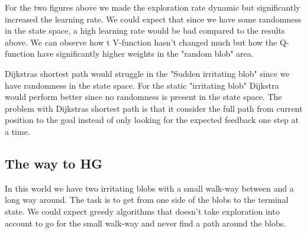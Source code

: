 \documentclass[a4paper,12pt]{article}
\begin{document}
For the two figures above we made the exploration rate dynamic but significantly increased the learning rate. We could expect that since we have some randomness in the state space, a high learning rate would be bad compared to the results above. We can observe how t V-function hasn't changed much but how the Q-function have significantly higher weights in the "random blob" area. 

Dijkstras shortest path would struggle in the "Sudden irritating blob" since we have randomness in the state space. For the static "irritating blob" Dijkstra would perform better since no randomness is present in the state space. The problem with Dijkstras shortest path  is that it consider the full path from current position to the goal instead of only looking for the expected feedback one step at a time.

\subsection{The way to HG}

In this world we have two irritating blobs with a small walk-way between and a long way around. The task is to get from one side of the blobs to the terminal state. We could expect greedy algorithms that doesn't take exploration into account to go for the small walk-way and never find a path around the blobs. 
\end{document}
